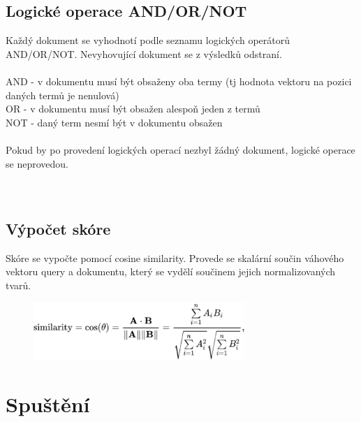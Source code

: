 \section{Logické operace AND/OR/NOT}
Každý dokument se vyhodnotí podle seznamu logických operátorů AND/OR/NOT. Nevyhovující dokument se z výsledků odstraní.\\
\\
AND - v dokumentu musí být obsaženy oba termy (tj hodnota vektoru na pozici daných termů je nenulová)\\
OR - v dokumentu musí být obsažen alespoň jeden z termů\\
NOT - daný term nesmí být v dokumentu obsažen\\
\\
Pokud by po provedení logických operací nezbyl žádný dokument, logické operace se neprovedou.\\ \\ \\

\section{Výpočet skóre}
Skóre se vypočte pomocí cosine similarity. Provede se skalární součin váhového vektoru query a dokumentu, který se vydělí součinem jejich normalizovaných tvarů.

\begin{figure}[h]
\includegraphics[width=8cm]{cosine}
\centering
\end{figure}


\chapter{Spuštění}

